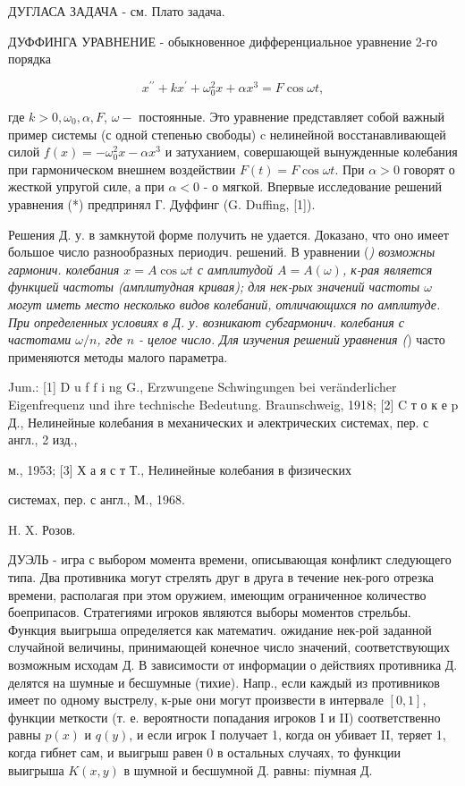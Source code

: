 \documentclass[10pt]{article}
\begin{document}
ДУГЛАСА ЗАДАЧА - см. Плато задача.



ДУФФИНГА УРАВНЕНИЕ - обыкновенное дифференциальное уравнение 2-го порядка



\[

x^{\prime \prime}+k x^{\prime}+\omega_{0}^{2} x+\alpha x^{3}=F \cos \omega t,

\]



где $k>0, \omega_{0}, \alpha, F$, $\omega-$ постоянные. Это уравнение представляет собой важный пример системы (с одной степенью свободы) $\mathrm{c}$ нелинейной восстанавливающей силой $f(x)=-\omega_{0}^{2} x-\alpha x^{3}$ и затуханием, совершающей вынужденные колебания при гармоническом внешнем воздействии $F(t)=F \cos \omega t$. При $\alpha>0$ говорят о жесткой упругой силе, а при $\alpha<0$ - о мягкой. Впервые исследование решений уравнения (*) предпринял Г. Дуффинг (G. Duffing, [1]).



Решения Д. у. в замкнутой форме получить не удается. Доказано, что оно имеет большое число разнообразных периодич. решений. В уравнении (\textit{) возможны гармонич. колебания $x=A \cos \omega t$ с амплитудой $A=A(\omega)$, к-рая является функцией частоты (амплитудная кривая); для нек-рых значений частоты $\omega$ могут иметь место несколько видов колебаний, отличающихся по амплитуде. При определенных условиях в Д. у. возникают субгармонич. колебания с частотами $\omega / n$, где $n$ - целое число. Для изучения решений уравнения (}) часто применяются методы малого параметра.



Jum.: [1] D u f $\mathrm{f}$ i ng G., Erzwungene Schwingungen bei veränderlicher Eigenfrequenz und ihre technische Bedeutung. Braunschweig, 1918; [2] C т о к е p Д., Нелинейные колебания в механических и әлектрических системах, пер. с англ., 2 изд.,

м., 1953; [3] Х а я с т Т., Нелинейные колебания в физических

системах, пер. с англ., М., 1968.

H. X. Розов.



ДУЭЛЬ - игра с выбором момента времени, описывающая конфликт следующего типа. Два противника могут стрелять друг в друга в течение нек-рого отрезка времени, располагая при этом оружием, имеющим ограниченное количество боеприпасов. Стратегиями игроков являются выборы моментов стрельбы. Функция выигрыша определяется как математич. ожидание нек-рой заданной случайной величины, принимающей конечное число значений, соответствующих возможным исходам Д. В зависимости от информации о действиях противника Д. делятся на шумные и бесшумные (тихие). Напр., если каждый из противников имеет по одному выстрелу, к-рые они могут произвести в интервале $[0,1]$, функции меткости (т. е. вероятности попадания игроков I и II) соответственно равны $p(x)$ и $q(y)$, и если игрок I получает 1, когда он убивает II, теряет 1, когда гибнет сам, и выигрыш равен 0 в остальных случаях, то функции выигрыша $K(x, y)$ в шумной и бесшумной Д. равны: піумная Д.
\end{document}
